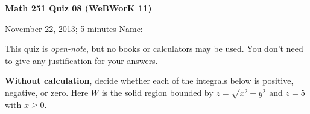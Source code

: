 \documentclass[12pt]{exam}
\begin{document}
\noindent
\textbf{{\large Math 251 \hfill Quiz 08 (WeBWorK 11)}}

\noindent
November 22, 2013; 5 minutes \hfill Name: \underline{\hspace{3in}} 

\noindent

\noindent
This quiz is \emph{open-note}, but no books or calculators may be used.
You don't need to give any justification for your answers.

\begin{questions} 

\question[9] \textbf{Without calculation}, decide whether each of the integrals below is positive, negative, or zero. Here $W$ is the solid region bounded by $z = \sqrt{x^2 + y^2}$ and $z = 5$ with $x \geq 0$.


\end{questions} 
\end{document}
